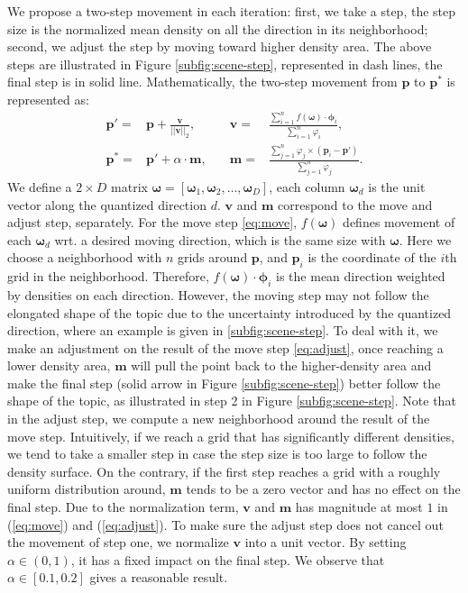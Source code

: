     We propose a two-step movement in each iteration: first, we take a step, the step size is the normalized mean density on all the direction in its neighborhood; second, we adjust the step by moving toward higher density area. 
    The above steps are illustrated in Figure \ref{subfig:scene-step}, represented in dash lines, the final step is in solid line. 
    Mathematically, the two-step movement from $\bm{p}$ to $\bm{p^*}$ is represented as:
    \begin{align}
        \bm{p}' =&\bm{p} + \frac{\bm{v}}{||\bm{v}||_2}, \quad
        & \bm{v} = & \frac{\sum_{i=1}^n{ f(\bm{\omega})\cdot\bm{\phi}_i}}{{\sum_{i=1}^n{\varphi_i}}}, \label{eq:move}\\
        \bm{p}^* =& \bm{p}' + \alpha\cdot \bm{m}, \quad
        & \bm{m} = &\frac{\sum_{j=1}^n{\varphi_j\times(\bm{p}_i-\bm{p}')}}{\sum_{j=1}^n{\varphi_j}}.\label{eq:adjust}
    \end{align}
    We define a $2\times D$ matrix $\bm{\omega} = [\bm{\omega}_1, \bm{\omega}_2, \dots, \bm{\omega}_D]$, each column $\bm{\omega}_{d}$ is the unit vector along the quantized direction $d$.
    $\bm{v}$ and $\bm{m}$ correspond to the move and adjust step, separately. 
    For the move step \ref{eq:move}, $f(\bm{\omega})$ defines movement of each $\bm{\omega}_d$ wrt. a desired moving direction, which is the same size with $\bm{\omega}$. 
    Here we choose a neighborhood with $n$ grids around $\bm{p}$, and $\bm{p}_{i}$ is the coordinate of the $i$th grid in the neighborhood. 
    Therefore, $f(\bm{\omega})\cdot\bm{\phi}_i$ is the mean direction weighted by densities on each direction. 
    However, the moving step may not follow the elongated shape of the topic due to the uncertainty introduced by the quantized direction, where an example is given in \ref{subfig:scene-step}. 
    To deal with it, we make an adjustment on the result of the move step \ref{eq:adjust}, once reaching a lower density area, $\bm{m}$ will pull the point back to the higher-density area and make the final step (solid arrow in Figure \ref{subfig:scene-step}) better follow the shape of the topic, as illustrated in step 2 in Figure \ref{subfig:scene-step}.
    Note that in the adjust step, we compute a new neighborhood around the result of the move step.
    Intuitively, if we reach a grid that has significantly different densities, we tend to take a smaller step in case the step size is too large to follow the density surface. 
    On the contrary, if the first step reaches a grid with a roughly uniform distribution around, $\bm{m}$ tends to be a zero vector and has no effect on the final step.
    Due to the normalization term, $\bm{v}$ and $\bm{m}$ has magnitude at most $1$ in (\ref{eq:move}) and (\ref{eq:adjust}). 
    To make sure the adjust step does not cancel out the movement of step one, we normalize $\bm{v}$ into a unit vector. By setting $\alpha\in(0,1)$, it has a fixed impact on the final step. We observe that $\alpha\in[0.1,0.2]$ gives a reasonable result.

